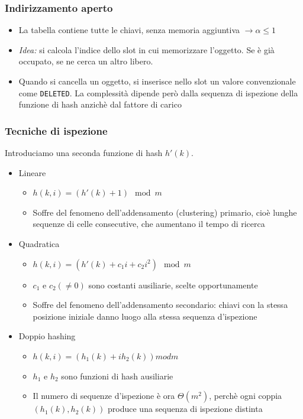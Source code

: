 \documentclass[10pt,a4paper]{article}
\newcommand{\code}{\texttt}
\begin{document}
\begin{multicols*}{2}
\subsubsection*{Indirizzamento aperto}
\begin{itemize}
    \item La tabella contiene tutte le chiavi, senza memoria aggiuntiva $\rightarrow \alpha \le 1$
    \item \emph{Idea:} si calcola l'indice dello slot in cui memorizzare l'oggetto. Se è già occupato, se ne cerca un altro libero.
    \item Quando si cancella un oggetto, si inserisce nello slot un valore convenzionale come \code{DELETED}. La complessità dipende però dalla sequenza di ispezione della funzione di hash anzichè dal fattore di carico
\end{itemize}
\subsubsection*{Tecniche di ispezione}
Introduciamo una seconda funzione di hash $h'(k)$.
\begin{itemize}
    \item Lineare
        \begin{itemize}
            \item $h(k,i)=\left(h'(k)+1\right) \mod{m}$
            \item Soffre del fenomeno dell'addensamento (clustering) primario, cioè lunghe sequenze di celle consecutive, che aumentano il tempo di ricerca
        \end{itemize}
    \item Quadratica
        \begin{itemize}
            \item $h(k,i) = \left(h'(k)+c_1i+c_2i^2\right) \mod{m}$
            \item $c_1$ e $c_2 (\not= 0)$ sono costanti ausiliarie, scelte opportunamente
            \item Soffre del fenomeno dell'addensamento secondario: chiavi con la stessa posizione iniziale danno luogo alla stessa sequenza d'ispezione
        \end{itemize}
    \item Doppio hashing
        \begin{itemize}
            \item $h(k,i) = \left(h_1(k)+ih_2(k)\right) mod{m}$
            \item $h_1$ e $h_2$ sono funzioni di hash ausiliarie
            \item Il numero di sequenze d'ispezione è ora $\varTheta(m^2)$, perchè ogni coppia $(h_1(k), h_2(k))$ produce una sequenza di ispezione distinta
        \end{itemize}
\end{itemize}

\end{multicols*}
\end{document}
